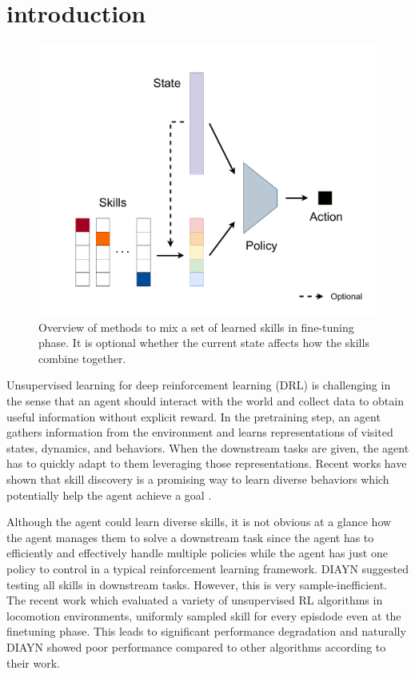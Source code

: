 \section{introduction}
\label{submission}

\begin{figure}[ht]
  \vskip 0.2in
  \begin{center}
  \centerline{\includegraphics[width=\columnwidth]{Figures/figure_diagram.pdf}}
  \caption{Overview of methods to mix a set of learned skills in fine-tuning phase. It is optional whether the current state affects how the skills combine together.}
  \label{overview}
  \end{center}
  \vskip -0.2in
\end{figure}

Unsupervised learning for deep reinforcement learning (DRL) is challenging in the sense that an agent should interact with the world and collect data to obtain useful information without explicit reward.
In the pretraining step, an agent gathers information from the environment and learns representations of visited states, dynamics, and behaviors.
When the downstream tasks are given, the agent has to quickly adapt to them leveraging those representations.
Recent works have shown that skill discovery is a promising way to learn diverse behaviors which potentially help the agent achieve a goal \cite{salge2014empowerment, gregor2016variational, eysenbach2018diversity}.

Although the agent could learn diverse skills, it is not obvious at a glance how the agent manages them to solve a downstream task since the agent has to efficiently and effectively handle multiple policies while the agent has just one policy to control in a typical reinforcement learning framework.
DIAYN\cite{eysenbach2018diversity} suggested testing all skills in downstream tasks. However, this is very sample-inefficient.
The recent work \cite{laskin2021urlb} which evaluated a variety of unsupervised RL algorithms in locomotion environments, uniformly sampled skill for every episdode even at the finetuning phase.
This leads to significant performance degradation and naturally DIAYN showed poor performance compared to other algorithms according to their work.

